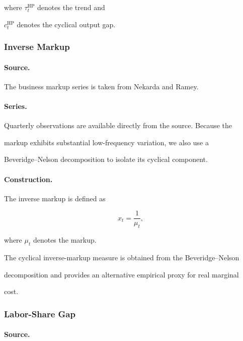 \documentclass[11pt]{article}
\begin{document}
where $\tau_t^{\mathrm{HP}}$ denotes the trend and

$c_t^{\mathrm{HP}}$ denotes the cyclical output gap.



\subsubsection{Inverse Markup}

\paragraph{Source.}

The business markup series is taken from Nekarda and Ramey.

\paragraph{Series.}

Quarterly observations are available directly from the source. Because the

markup exhibits substantial low-frequency variation, we also use a

Beveridge--Nelson decomposition to isolate its cyclical component.

\paragraph{Construction.}

The inverse markup is defined as

\begin{equation}
x_t
=
\frac{1}{\mu_t},
\end{equation}

where $\mu_t$ denotes the markup.

The cyclical inverse-markup measure is obtained from the Beveridge--Nelson

decomposition and provides an alternative empirical proxy for real marginal

cost.



\subsubsection{Labor-Share Gap}

\paragraph{Source.}
\end{document}
